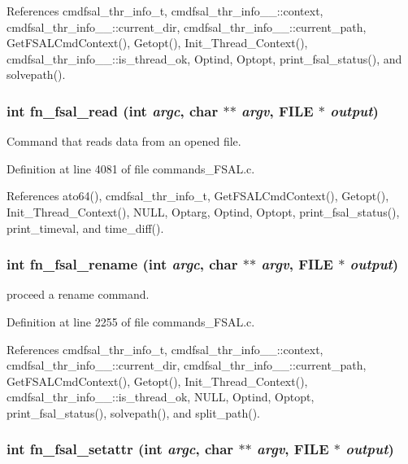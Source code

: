 References cmdfsal\_\-thr\_\-info\_\-t, cmdfsal\_\-thr\_\-info\_\-\_\-::context, cmdfsal\_\-thr\_\-info\_\-\_\-::current\_\-dir, cmdfsal\_\-thr\_\-info\_\-\_\-::current\_\-path, Get\-FSALCmd\-Context(), Getopt(), Init\_\-Thread\_\-Context(), cmdfsal\_\-thr\_\-info\_\-\_\-::is\_\-thread\_\-ok, Optind, Optopt, print\_\-fsal\_\-status(), and solvepath().
\subsubsection{\setlength{\rightskip}{0pt plus 5cm}int fn\_\-fsal\_\-read (int {\em argc}, char $\ast$$\ast$ {\em argv}, FILE $\ast$ {\em output})}\label{commands_8h_a25}


Command that reads data from an opened file. 

Definition at line 4081 of file commands\_\-FSAL.c.

References ato64(), cmdfsal\_\-thr\_\-info\_\-t, Get\-FSALCmd\-Context(), Getopt(), Init\_\-Thread\_\-Context(), NULL, Optarg, Optind, Optopt, print\_\-fsal\_\-status(), print\_\-timeval, and time\_\-diff().
\subsubsection{\setlength{\rightskip}{0pt plus 5cm}int fn\_\-fsal\_\-rename (int {\em argc}, char $\ast$$\ast$ {\em argv}, FILE $\ast$ {\em output})}\label{commands_8h_a15}


proceed a rename command. 

Definition at line 2255 of file commands\_\-FSAL.c.

References cmdfsal\_\-thr\_\-info\_\-t, cmdfsal\_\-thr\_\-info\_\-\_\-::context, cmdfsal\_\-thr\_\-info\_\-\_\-::current\_\-dir, cmdfsal\_\-thr\_\-info\_\-\_\-::current\_\-path, Get\-FSALCmd\-Context(), Getopt(), Init\_\-Thread\_\-Context(), cmdfsal\_\-thr\_\-info\_\-\_\-::is\_\-thread\_\-ok, NULL, Optind, Optopt, print\_\-fsal\_\-status(), solvepath(), and split\_\-path().
\subsubsection{\setlength{\rightskip}{0pt plus 5cm}int fn\_\-fsal\_\-setattr (int {\em argc}, char $\ast$$\ast$ {\em argv}, FILE $\ast$ {\em output})}\label{commands_8h_a19}



